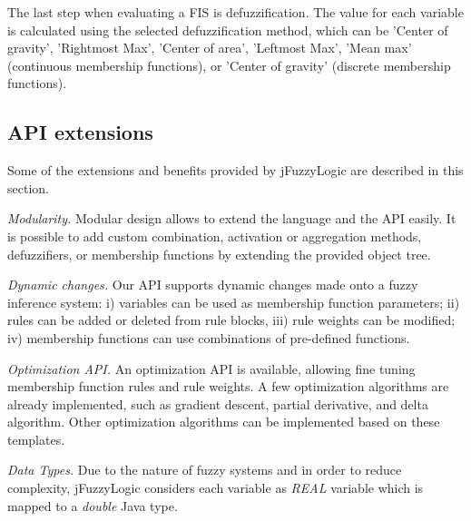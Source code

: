 \documentclass[conference]{IEEEtran}
\begin{document}
The last step when evaluating a FIS is defuzzification.
The value for each variable is calculated using the selected defuzzification method, which can be 'Center of gravity', 'Rightmost Max', 'Center of area', 'Leftmost Max', 'Mean max' (continuous membership functions), or 'Center of gravity' (discrete membership functions). 

\subsection{API extensions \label{sec:ext}}

Some of the extensions and benefits provided by jFuzzyLogic are described in this section.

\textit{Modularity.} Modular design allows to extend the language and the API easily. It is possible to add custom combination, activation or aggregation methods, defuzzifiers, or membership functions by extending the provided object tree. 


\textit{Dynamic changes.} Our API supports dynamic changes made onto a fuzzy inference system: i) variables can be used as membership function parameters; ii) rules can be added or deleted from rule blocks, iii) rule weights can be modified; iv) membership functions can use combinations of pre-defined functions. 

\textit{Optimization API.} An optimization API is available, allowing fine tuning membership function rules and rule weights.
A few optimization algorithms are already implemented, such as gradient descent, partial derivative, and delta algorithm.
Other optimization algorithms can be implemented based on these templates.


\textit{Data Types.} Due to the nature of fuzzy systems and in order to reduce complexity, jFuzzyLogic considers each variable as \textit{REAL} variable which is mapped to a \textit{double} Java type.
\end{document}
